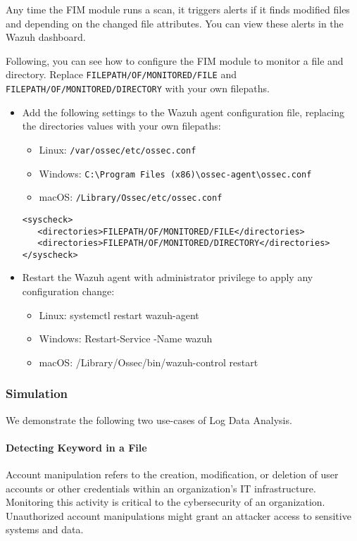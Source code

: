 Any time the FIM module runs a scan, it triggers alerts if it finds modified files and depending on the changed file attributes. You can view these alerts in the Wazuh dashboard.

Following, you can see how to configure the FIM module to monitor a file and directory. Replace \texttt{FILEPATH/OF/MONITORED/FILE} and \texttt{FILEPATH/OF/MONITORED/DIRECTORY} with your own filepaths.

\begin{itemize}
    \item Add the following settings to the Wazuh agent configuration file, replacing the directories values with your own filepaths:
          \begin{itemize}
              \item Linux: \texttt{/var/ossec/etc/ossec.conf}
              \item Windows: \texttt{C:\textbackslash Program Files (x86)\textbackslash ossec-agent\textbackslash ossec.conf}
              \item macOS: \texttt{/Library/Ossec/etc/ossec.conf}
          \end{itemize}
          \begin{verbatim}
<syscheck>
   <directories>FILEPATH/OF/MONITORED/FILE</directories>
   <directories>FILEPATH/OF/MONITORED/DIRECTORY</directories>
</syscheck>
        \end{verbatim}


    \item Restart the Wazuh agent with administrator privilege to apply any configuration change:
          \begin{itemize}
              \item Linux: systemctl restart wazuh-agent
              \item Windows: Restart-Service -Name wazuh
              \item macOS: /Library/Ossec/bin/wazuh-control restart
          \end{itemize}
\end{itemize}

\subsubsection{Simulation}
We demonstrate the following two use-cases of Log Data Analysis.
\paragraph{Detecting Keyword in a File}
Account manipulation refers to the creation, modification, or deletion of user accounts or other credentials within an organization's IT infrastructure. Monitoring this activity is critical to the cybersecurity of an organization. Unauthorized account manipulations might grant an attacker access to sensitive systems and data.

